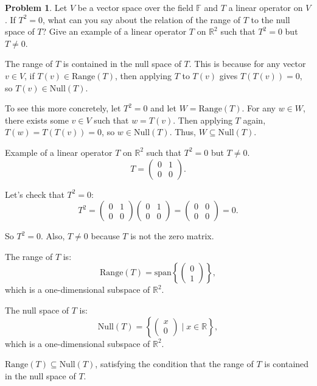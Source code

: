 \documentclass[12pt]{article}
\theoremstyle{definition}
\newtheorem{problem}{Problem}
\begin{document}
\begin{problem}
    Let $V$ be a vector space over the field $\mathbb{F}$ and $T$ a linear operator on $V$. If $T^2 = 0$, what can you say about the relation of the range
    of $T$ to the null space of $T$? Give an example of a linear operator $T$ on $\mathbb{R}^2$ such that $T^2 = 0$ but $T \neq 0$.

    \begin{solution}
        The range of \(T\) is contained in the null space of \(T\). This is because for any vector \(v \in V\), if \(T(v) \in \text{Range}(T)\), then applying \(T\) to \(T(v)\) gives \(T(T(v)) = 0\), so \(T(v) \in \text{Null}(T)\).
    
        To see this more concretely, let \(T^2 = 0\) and let \(W = \text{Range}(T)\). For any \(w \in W\), there exists some \(v \in V\) such that \(w = T(v)\). Then applying \(T\) again, \(T(w) = T(T(v)) = 0\), so \(w \in \text{Null}(T)\). Thus, \(W \subseteq \text{Null}(T)\).
    
        Example of a linear operator \(T\) on \(\mathbb{R}^2\) such that \(T^2 = 0\) but \(T \neq 0\).
        \[
        T = \begin{pmatrix}
        0 & 1 \\
        0 & 0
        \end{pmatrix}.
        \]
    
        Let's check that \(T^2 = 0\):
        \[
        T^2 = \begin{pmatrix}
        0 & 1 \\
        0 & 0
        \end{pmatrix} \begin{pmatrix}
        0 & 1 \\
        0 & 0
        \end{pmatrix} = \begin{pmatrix}
        0 & 0 \\
        0 & 0
        \end{pmatrix} = 0.
        \]
    
        So \(T^2 = 0\). Also, \(T \neq 0\) because \(T\) is not the zero matrix.
    
        The range of \(T\) is:
        \[
        \text{Range}(T) = \text{span} \left\{ \begin{pmatrix}
        0 \\
        1
        \end{pmatrix} \right\},
        \]
        which is a one-dimensional subspace of \(\mathbb{R}^2\).
    
        The null space of \(T\) is:
        \[
        \text{Null}(T) = \left\{ \begin{pmatrix}
        x \\
        0
        \end{pmatrix} \mid x \in \mathbb{R} \right\},
        \]
        which is a one-dimensional subspace of \(\mathbb{R}^2\).
    
        \(\text{Range}(T) \subseteq \text{Null}(T)\), satisfying the condition that the range of \(T\) is contained in the null space of \(T\).
    \end{solution}
\end{problem}
\end{document}
